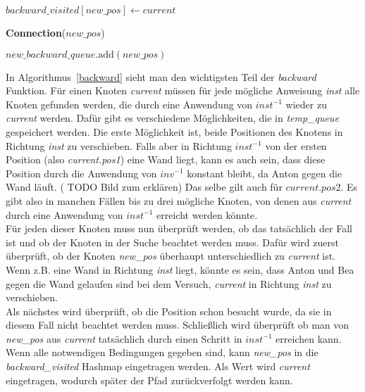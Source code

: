 \documentclass[a4paper,10pt,ngerman]{scrartcl}
\begin{document}
\begin{algorithm}[H]
\begin{algorithmic}[1]
                        \State $\textit{backward\_visited}[\textit{new\_pos}] \gets \textit{current}$

                            \State \Return \textbf{Connection}($\textit{new\_pos}$)
                        \EndIf

                        \State $\textit{new\_backward\_queue}.\text{add}(\textit{new\_pos})$
                    \EndFor
                \EndFor
            \EndFunction
        \end{algorithmic}
    \end{algorithm}
    In Algorithmus~\ref{backward} sieht man den wichtigsten Teil der \textit{backward} Funktion. Für einen Knoten \textit{current} müssen für jede mögliche Anweisung \textit{inst} alle Knoten gefunden werden, die durch eine Anwendung von $\textit{inst}^{-1}$ wieder zu \textit{current} werden. Dafür gibt es verschiedene Möglichkeiten, die in \textit{temp\_queue} gespeichert werden. Die erste Möglichkeit ist, beide Positionen des Knotens in Richtung \textit{inst} zu verschieben. Falls aber in Richtung $\textit{inst}^{-1}$ von der ersten Position (also \textit{current.pos1}) eine Wand liegt, kann es auch sein, dass diese Position durch die Anwendung von $\textit{inv}^{-1}$ konstant bleibt, da Anton gegen die Wand läuft. (    TODO Bild zum erklären) Das selbe gilt auch für $\textit{current.pos2}$. Es gibt also in manchen Fällen bis zu drei mögliche Knoten, von denen aus \textit{current} durch eine Anwendung von $\textit{inst}^{-1}$ erreicht werden könnte. \\
    Für jeden dieser Knoten muss nun überprüft werden, ob das tatsächlich der Fall ist und ob der Knoten in der Suche beachtet werden muss. Dafür wird zuerst überprüft, ob der Knoten \textit{new\_pos} überhaupt unterschiedlich zu \textit{current} ist. Wenn z.B. eine Wand in Richtung \textit{inst} liegt, könnte es sein, dass Anton und Bea gegen die Wand gelaufen sind bei dem Versuch, \textit{current} in Richtung \textit{inst} zu verschieben. \\
    Als nächstes wird überprüft, ob die Position schon besucht wurde, da sie in diesem Fall nicht beachtet werden muss. Schließlich wird überprüft ob man von \textit{new\_pos} aus \textit{current} tatsächlich durch einen Schritt in $\textit{inst}^{-1}$ erreichen kann.\\
    Wenn alle notwendigen Bedingungen gegeben sind, kann \textit{new\_pos} in die \textit{backward\_visited} Hashmap eingetragen werden. Als Wert wird \textit{current} eingetragen, wodurch später der Pfad zurückverfolgt werden kann. \\
\end{document}
